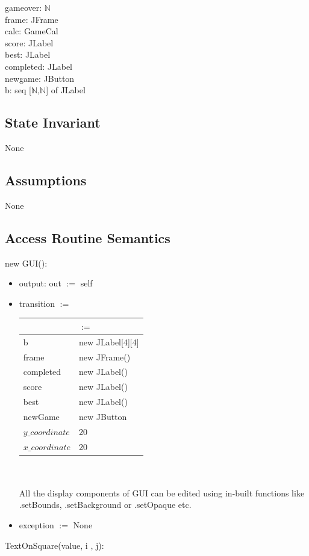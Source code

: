 \documentclass[12pt]{article}
\begin{document}
gameover: $\mathbb{N}$ \\
frame: JFrame\\
calc: GameCal \\
score: JLabel\\
best: JLabel\\
completed: JLabel\\ 
newgame: JButton\\
b: seq [$\mathbb{N}$,$\mathbb{N}$] of JLabel

\subsection* {State Invariant}

None

\subsection*{Assumptions}

None

\subsection* {Access Routine Semantics}

new GUI():

\begin{itemize}
  \item output: out $:=$ self
  \item transition $:=$   \begin{tabular}{| l | l |}
  \hline
  ~ & $:=$ \\
  \hline
  b & new JLabel[4][4] \\
  \hline
  frame & new JFrame() \\
  \hline
  completed & new JLabel() \\
  \hline
  score & new JLabel() \\
  \hline
  best & new JLabel() \\
  \hline
  newGame & new JButton \\
  \hline
  $y\_coordinate$ & 20 \\
  \hline
  $x\_coordinate$ & 20 \\
  \hline
  \end{tabular}\\\\
  All the display components of GUI can be edited using in-built functions like .setBounds, .setBackground or .setOpaque etc.
   \item exception $:=$ None
  \end{itemize}
\newpage
\noindent TextOnSquare(value, i , j):
\end{document}
